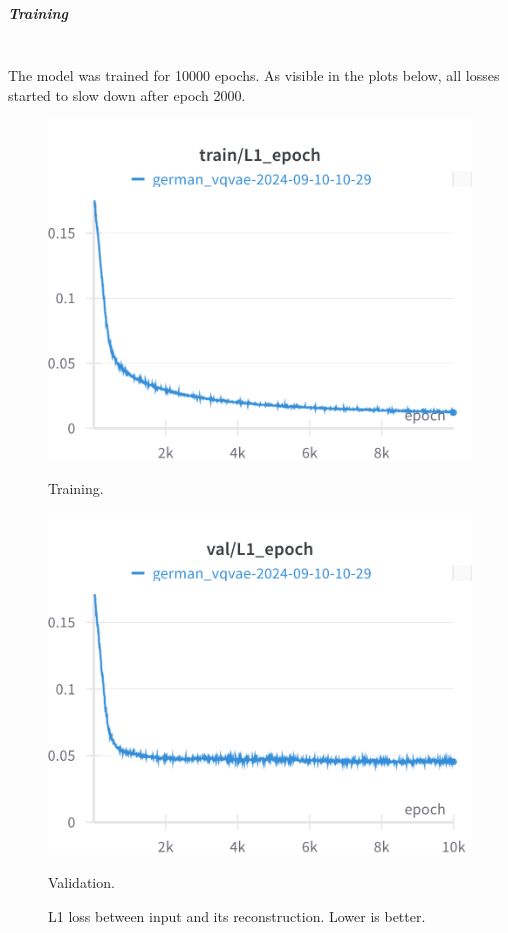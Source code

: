 \subparagraph{Training}\mbox{}\\

The model was trained for 10000 epochs. As visible in the plots below, all losses started to slow down after epoch 2000. 

\begin{figure}[H]
\includegraphics[width=\linewidth]{detailed_engineering/German VQVAE/charts/train_l1.png}
\caption{Training.}
\endminipage\hfill
{}
\includegraphics[width=\linewidth]{detailed_engineering/German VQVAE/charts/val_l1.png}
\caption{Validation.}
\endminipage
\caption{L1 loss between input and its reconstruction. Lower is better.}
\end{figure}

